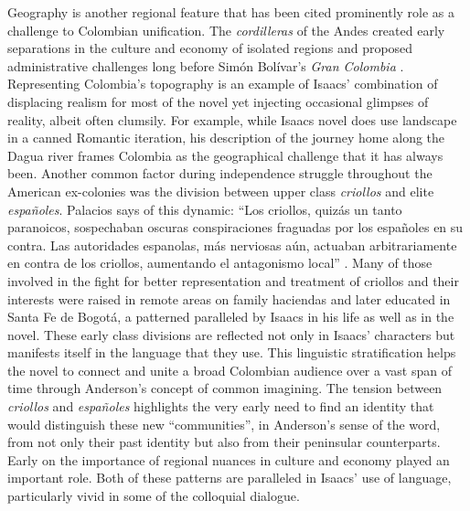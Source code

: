 Geography is another regional feature that has been cited prominently role as a challenge to Colombian unification.
The \textit{cordilleras} of the Andes created early separations in the culture and economy of isolated regions and proposed administrative challenges long before Simón Bolívar's \textit{Gran Colombia} \autocite[229]{Palacios2002}.
Representing Colombia's topography is an example of Isaacs' combination of displacing realism for most of the novel yet injecting occasional glimpses of reality, albeit often clumsily. 
For example, while Isaacs novel does use landscape in a canned Romantic iteration, his description of the journey home along the Dagua river frames Colombia as the geographical challenge that it has always been.
Another common factor during independence struggle throughout the American ex-colonies was the division between upper class \textit{criollos} and elite \textit{españoles}. 
Palacios says of this dynamic: \enquote{Los criollos, quizás un tanto paranoicos, sospechaban oscuras conspiraciones fraguadas por los españoles en su contra. Las autoridades espanolas, más nerviosas aún, actuaban arbitrariamente en contra de los criollos, aumentando el antagonismo local} \autocite[192]{Palacios2002}. 
Many of those involved in the fight for better representation and treatment of criollos and their interests were raised in remote areas on family haciendas and later educated in Santa Fe de Bogotá, a patterned paralleled by Isaacs in his life as well as in the novel. 
These early class divisions are reflected not only in Isaacs' characters but manifests itself in the language that they use. 
This linguistic stratification helps the novel to connect and unite a broad Colombian audience over a vast span of time through Anderson's concept of common imagining.
The tension between \textit{criollos} and \textit{españoles} highlights the very early need to find an identity that would distinguish these new \enquote{communities}, in Anderson's sense of the word, from not only their past identity but also from their peninsular counterparts. 
Early on the importance of regional nuances in culture and economy played an important role.
Both of these patterns are paralleled in Isaacs' use of language, particularly vivid in some of the colloquial dialogue.


